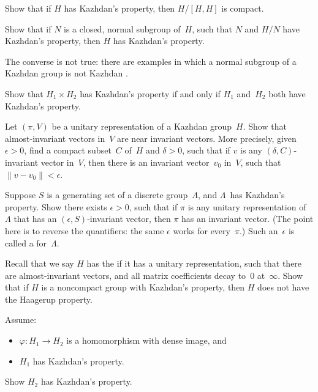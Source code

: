 \begin{exercises}
\item \label{KazhdanAbelianization}
Show that if $H$ has Kazhdan's property, then $H/[H,H]$ is compact.

\item Show that if $N$ is a closed, normal subgroup of~$H$, such that $N$ and $H/N$ have Kazhdan's property, then $H$ has Kazhdan's property.

\begin{warn*}
The converse is not true: there are examples in which a normal subgroup of a Kazhdan group is not Kazhdan .
\end{warn*}

\item Show that $H_1 \times H_2$ has Kazhdan's property if and only if $H_1$ and~$H_2$ both have Kazhdan's property.

\item Let $(\pi,V)$ be a unitary representation of a Kazhdan group~$H$. Show that almost-invariant vectors in~$V$ are near invariant vectors. More precisely, given $\epsilon > 0$, find a compact subset~$C$ of~$H$ and $\delta > 0$, such that if $v$ is any $(\delta,C)$-invariant vector in~$V$, then there is an invariant vector~$v_0$ in~$V$, such that $\| v - v_0 \| < \epsilon$.

\item \label{KazhdanConstEx}
Suppose $S$ is a generating set of a discrete group~$\Lambda$, and $\Lambda$~has Kazhdan's property. Show there exists $\epsilon > 0$, such that if $\pi$ is any unitary representation of~$\Lambda$ that has an $(\epsilon,S)$-invariant vector, then $\pi$ has an invariant vector. 
(The point here is to reverse the quantifiers: the same $\epsilon$ works for every~$\pi$.)
Such an~$\epsilon$ is called a  for~$\Lambda$.

\item \label{T->NotHaagerup}
Recall that we say $H$ has the  if it has a unitary representation, such that there are almost-invariant vectors, and all matrix coefficients decay to~$0$ at~$\infty$.
Show that if $H$ is a noncompact group with Kazhdan's property, then $H$ does not have the Haagerup property.

\item Assume:
	\begin{itemize}
	\item $\varphi \colon H_1 \to H_2$ is a homomorphism with dense image,
	and
	\item $H_1$ has Kazhdan's property.
	\end{itemize}
Show $H_2$ has Kazhdan's property.


\end{exercises}
